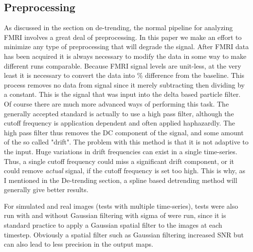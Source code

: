 \documentclass{article}
\begin{document}
\subsection{Preprocessing}
As discussed in the section on de-trending, the normal pipeline for analyzing
FMRI involves a great deal of preprocessing. In this paper we make an effort to
minimize any type of preprocessing that will degrade the signal. 
After FMRI data has been acquired it is always necessary to modify the
data in some way to make different runs comparable. Because FMRI signal
levels are unit-less, at the very least it is necessary to convert
the data into \% difference from the baseline. This process removes no data
from signal since it merely subtracting then dividing by a constant. This
is the signal that was input into the delta based particle filter.
Of course there are much more advanced ways of performing this task.
The generally accepted standard is actually to use a high pass filter, although the
cutoff frequency is application dependent and often applied haphazardly.
The high pass filter thus removes the DC component of the signal, and 
some amount of the so called "drift". The problem with this method is that it is
not adaptive to the input. Huge variations in drift frequencies can exist 
in a single time-series. Thus, a single cutoff frequency could miss a significant
drift component, or it could remove \emph{actual} signal, if the cutoff frequency is
set too high. This is why, as I mentioned in the De-trending section, a spline
based detrending method will generally give better results. 

For simulated and real images (tests with multiple time-series), tests were 
also run with and without Gaussian filtering with sigma of %
were run, since it is standard
practice to apply a Gaussian spatial filter to the images at each timestep. Obviously
a spatial filter such as Gaussian filtering increased SNR but can also lead to less
precision in the output maps.
\end{document}
